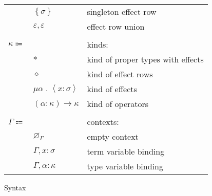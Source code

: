 \documentclass[12pt]{article}
\newcommand\anno[2]{#1 : #2} %
\newcommand\parens[1]{\left( #1 \right)} %
\newcommand\evar{x}
\newcommand\type{\sigma}
\newcommand\tvar{\alpha}
\newcommand\row{\varepsilon}
\newcommand\rsingleton[1]{\left\{ #1 \right\}}
\newcommand\runion[2]{#1, #2}
\newcommand\kind{\kappa}
\newcommand\ktype{\ast}
\newcommand\krow{\diamond} %
\newcommand\keffect[3]{\mu #1 \; . \; \left\langle\anno{#2}{#3}\right\rangle} %
\newcommand\karrow[2]{\parens{#1} \rightarrow #2} %
\newcommand\context{\Gamma}
\newcommand\cempty{\varnothing_{\context}}
\newcommand\ceextend[2]{#1, #2}
\newcommand\csextend[2]{#1, #2}
\begin{document}
\begin{figure}
\begin{mdframed}[backgroundcolor=none]
\begin{center}
\begin{tabular}{l l l}
          & $\rsingleton{\type}$ & singleton effect row \\
          & $\runion{\row}{\row}$ & effect row union \\
          \\
          $\kind \Coloneqq $ & & kinds: \\
          & $\ktype$ & kind of proper types with effects \\
          & $\krow$ & kind of effect rows \\
          & $\keffect{\tvar}{\evar}{\type}$ & kind of effects \\
          & \color{red} $\karrow{\anno{\tvar}{\kind}}{\kind}$ & \color{red} kind of operators \\
          \\
          $\context \Coloneqq$ & & contexts: \\
          & $\cempty$ & empty context \\
          & $\ceextend{\context}{\anno{\evar}{\type}}$ & term variable binding \\
          & $\csextend{\context}{\anno{\tvar}{\kind}}$ & type variable binding \\
        \end{tabular}
      \end{center}

      \caption{Syntax}\label{fig:syntax}
    \end{mdframed}
  \end{figure}
\end{document}
